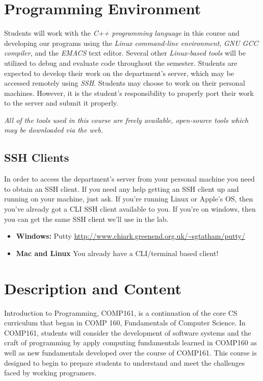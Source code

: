 \documentclass[10pt]{article}
\begin{document}
\section{Programming Environment}

Students will work with the \textit{C++ programming language} in this course and developing our programs using the \textit{Linux command-line environment}, \textit{GNU GCC compiler}, and the \textit{EMACS} text editor.  Several other \textit{Linux-based tools} will be utilized to debug and evaluate code throughout the semester. Students are expected to develop their work on the department's server, which may be accessed remotely using \textit{SSH}.  Students may choose to  work on their personal machines. However, it is the student's responsibility to properly port their work to the server and submit it properly.  

\textit{All of the tools used in this course are freely available, open-source tools which may be downloaded via the web.}


\subsection{SSH Clients}

In order to access the department's server from your personal machine you need to obtain an SSH client. If you need any help getting an SSH client up and running on your machine, just ask.  If you're running Linux or Apple's OS, then you've already got a CLI SSH client available to you.  If you're on windows, then you can get the same SSH client we'll use in the lab. 
\begin{itemize}
\item \textbf{Windows:} Putty \url{http://www.chiark.greenend.org.uk/~sgtatham/putty/}
\item \textbf{Mac and Linux} You already have a CLI/terminal based client!  
\end{itemize}

\section{Description and Content}

Introduction to Programming, COMP161, is a continuation of the core CS curriculum that began in COMP 160, Fundamentals of Computer Science.  In COMP161, students will consider the development of software systems and the craft of programming by apply computing fundamentals learned in COMP160 as well as new fundamentals developed over the course of COMP161. This course is designed to begin to prepare students to understand and meet the challenges faced by working programers.  
\end{document}
